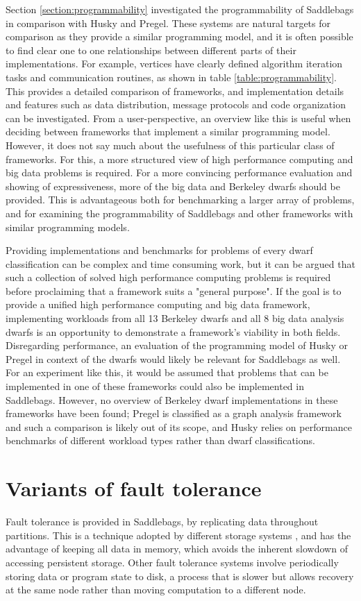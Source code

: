\documentclass{uit-report}
\begin{document}
Section \ref{section:programmability} investigated the programmability of Saddlebags in comparison with Husky and Pregel. These systems are natural targets for comparison as they provide a similar programming model, and it is often possible to find clear one to one relationships between different parts of their implementations. For example, vertices have clearly defined algorithm iteration tasks and communication routines, as shown in table \ref{table:programmability}. This provides a detailed comparison of frameworks, and implementation details and features such as data distribution, message protocols and code organization can be investigated. From a user-perspective, an overview like this is useful when deciding between frameworks that implement a similar programming model. However, it does not say much about the usefulness of this particular class of frameworks. For this, a more structured view of high performance computing and big data problems is required. For a more convincing performance evaluation and showing of expressiveness, more of the big data and Berkeley dwarfs should be provided. This is advantageous both for benchmarking a larger array of problems, and for examining the programmability of Saddlebags and other frameworks with similar programming models. 

Providing implementations and benchmarks for problems of every dwarf classification can be complex and time consuming work, but it can be argued that such a collection of solved high performance computing problems is required before proclaiming that a framework suits a "general purpose". If the goal is to provide a unified high performance computing and big data framework, implementing workloads from all 13 Berkeley dwarfs and all 8 big data analysis dwarfs is an opportunity to demonstrate a framework's viability in both fields. Disregarding performance, an evaluation of the programming model of Husky or Pregel in context of the dwarfs would likely be relevant for Saddlebags as well. For an experiment like this, it would be assumed that problems that can be implemented in one of these frameworks could also be implemented in Saddlebags. However, no overview of Berkeley dwarf implementations in these frameworks have been found; Pregel is classified as a graph analysis framework and such a comparison is likely out of its scope, and Husky relies on performance benchmarks of different workload types rather than dwarf classifications. 


\section{Variants of fault tolerance}
Fault tolerance is provided in Saddlebags, by replicating data throughout partitions. This is a technique adopted by different storage systems \cite{dynamo} \cite{ramcloud}, and has the advantage of keeping all data in memory, which avoids the inherent slowdown of accessing persistent storage. Other fault tolerance systems involve periodically storing data or program state to disk, a process that is slower but allows recovery at the same node rather than moving computation to a different node.
\end{document}
